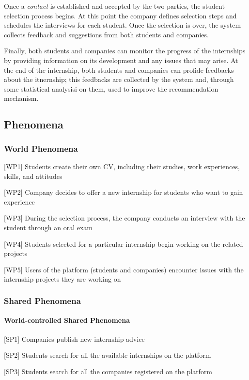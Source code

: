 		Once a \emph{contact} is established and accepted by the two parties, the student selection process begins. At this point the company defines selection steps and schedules the interviews for each student. Once the selection is over, the system collects feedback and suggestions from both students and companies.
		
		Finally, both students and companies can monitor the progress of the internships by providing information on its development and any issues that may arise. At the end of the internship, both students and companies can profide feedbacks about the itnernship; this feedbacks are collected by the system and, through some statistical analysisi on them, used to improve the recommendation mechanism.
		\subsection{Phenomena}
			\subsubsection{World Phenomena}
				[WP1] Students create their own CV, including their studies, work experiences, skills, and attitudes
				
				[WP2] Company decides to offer a new internship for students who want to gain experience
				
				[WP3] During the selection process, the company conducts an interview with the student through an oral exam
				
				[WP4] Students selected for a particular internship begin working on the related projects
				
				[WP5] Users of the platform (students and companies) encounter issues with the internship projects they are working on
			\subsubsection{Shared Phenomena}
				\paragraph{World-controlled Shared Phenomena}
				
				
					[SP1] Companies publish new internship advice
					
					[SP2] Students search for all the available internships on the platform
					
					[SP3] Students search for all the companies registered on the platform
					
